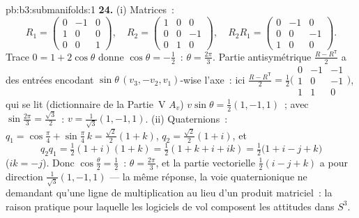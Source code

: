 \begin{solution}{pb:b3:submanifolds:1}
\textbf{24.} (i) Matrices~:
\[
R_1 = \begin{pmatrix} 0 & -1 & 0\\ 1 & 0 & 0\\ 0 & 0 & 1
\end{pmatrix},
\quad
R_2 = \begin{pmatrix} 1 & 0 & 0\\ 0 & 0 & -1\\ 0 & 1 & 0
\end{pmatrix},
\quad
R_2R_1 = \begin{pmatrix} 0 & -1 & 0\\ 0 & 0 & -1\\ 1 & 0 &
0\end{pmatrix}.
\]
Trace $0 = 1 + 2\cos\theta$ donne $\cos\theta = -\frac12$~:
$\theta = \frac{2\pi}3$. Partie antisymétrique $\frac{R -
R^{\mathsf T}}2$ a des entrées encodant $\sin\theta\,(v_3,
-v_2, v_1)$-wise l'axe~: ici $\frac{R - R^{\mathsf T}}2 =
\frac12\bigl(\begin{smallmatrix}0 & -1 & -1\\ 1 & 0 & -1\\ 1
& 1 & 0\end{smallmatrix}\bigr)$, qui se lit (dictionnaire
de la Partie~V $A_v$) $v\sin\theta = \frac12(1, -1, 1)$~;
avec $\sin\frac{2\pi}3 = \frac{\sqrt3}2$~: $v =
\frac1{\sqrt3}(1, -1, 1)$.
(ii) Quaternions~: $q_1 = \cos\frac\pi4 + \sin\frac\pi4\,k
= \frac{\sqrt2}2(1 + k)$, $q_2 = \frac{\sqrt2}2(1 + i)$, et
\[
q_2q_1 = \tfrac12(1 + i)(1 + k) = \tfrac12(1 + k + i + ik)
= \tfrac12\bigl(1 + i - j + k\bigr)
\]
($ik = -j$). Donc $\cos\frac\theta2 = \frac12$~: $\theta =
\frac{2\pi}3$, et la partie vectorielle $\frac12(i - j +
k)$ a pour direction $\frac1{\sqrt3}(1, -1, 1)$ --- la même
réponse, la voie quaternionique ne demandant qu'une ligne
de multiplication au lieu d'un produit matriciel~: la
raison pratique pour laquelle les logiciels de vol
composent les attitudes dans $S^3$.


\end{solution}
